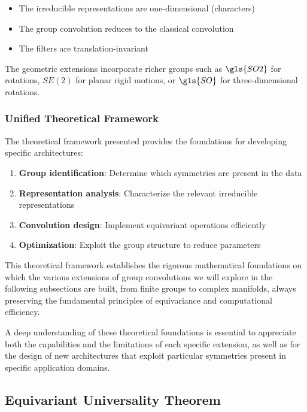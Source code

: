 \begin{itemize}
    \item The irreducible representations are one-dimensional (characters)
    \item The group convolution reduces to the classical convolution
    \item The filters are translation-invariant
\end{itemize}

The geometric extensions incorporate richer groups such as $\gls{SO2}$ for rotations, $SE(2)$ for planar rigid motions, or $\gls{SO}$ for three-dimensional rotations.

\subsubsection{Unified Theoretical Framework}

The theoretical framework presented provides the foundations for developing specific architectures:

\begin{enumerate}
    \item \textbf{Group identification}: Determine which symmetries are present in the data
    \item \textbf{Representation analysis}: Characterize the relevant irreducible representations
    \item \textbf{Convolution design}: Implement equivariant operations efficiently
    \item \textbf{Optimization}: Exploit the group structure to reduce parameters
\end{enumerate}

This theoretical framework establishes the rigorous mathematical foundations on which the various extensions of group convolutions we will explore in the following subsections are built, from finite groups to complex manifolds, always preserving the fundamental principles of equivariance and computational efficiency.

A deep understanding of these theoretical foundations is essential to appreciate both the capabilities and the limitations of each specific extension, as well as for the design of new architectures that exploit particular symmetries present in specific application domains.

\subsection{Equivariant Universality Theorem}\label{subsec:teorema_universalidad_equivariante}

